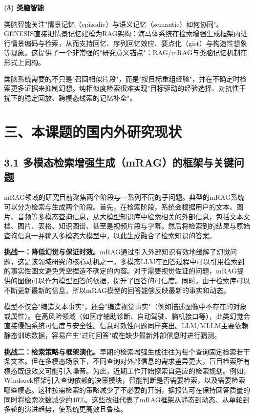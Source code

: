 \documentclass[12pt,a4paper]{article}
\begin{document}
\textbf{(3) 类脑智能}

类脑智能关注"情景记忆（episodic）与语义记忆（semantic）如何协同"。GENESIS直接把情景记忆建模为RAG架构：海马体系统在检索增强生成框架内进行情景编码与检索，从而支持回忆、序列回忆效应、要点化（gist）与构造性想象等现象\cite{genesis2025}。这提供了一个非常强的"研究意义锚点"：RAG/mRAG与类脑记忆机制在形式上同构。

类脑系统需要的不只是"召回相似片段"，而是"按目标重组经验"，并在不确定时检索更多证据来抑制幻想。纯相似度检索很难实现"目标驱动的经验选择、对抗性干扰下的稳定回放、跨模态线索的记忆补全"。

\section*{三、本课题的国内外研究现状}

\subsection*{3.1 多模态检索增强生成（mRAG）的框架与关键问题}

mRAG领域的研究目前聚焦两个阶段与一系列不同的子问题。典型的mRAG系统可以分为检索与生成两个阶段。首先，在检索阶段，系统会根据用户的文本、图片、音频等多模态查询信息，从大模型知识库中检索相关的外部信息，包括文本文档、图片、表格、知识图谱、甚至是视频片段与字幕。然后将检索到的结果与原始查询信息一并输入多模态大模型中，以此生成融合了检索知识的答案\cite{mei2025multimodalrag,abootorabi2025ask}。

\textbf{挑战一：降低幻觉与保证时效。}mRAG通过引入外部知识有效地缓解了幻觉问题，这是该领域研究的核心动机之一\cite{gao2023rag,li2023pope}。多模态LLM在回答过程中可以引用检索到的事实性图文避免凭空捏造不确定的内容。对于需要视觉佐证的问题，mRAG提供的图像可以作为模型回答的依据，提升了回答的可信度。同时，由于检索库可以不断更新最新的信息，所以mRAG模型的回答能够反映最新的事实和动态\cite{mei2025multimodalrag}。

模型不仅会"编造文本事实"，还会"编造视觉事实"（例如描述图像中不存在的对象或属性）。在高风险领域（如医疗辅助诊断、自动驾驶、脑机接口等），此类幻觉会直接侵蚀系统可信度与安全性。信息时效性问题同样突出。LLM/MLLM主要依赖静态训练数据，容易产生"过时回答"或在缺少最新外部信息时进行猜测\cite{gao2023rag}。

\textbf{挑战二：检索策略与框架演化。}早期的检索增强生成往往为每个查询固定检索若干条文本。但在多模态场景下，不同查询对外部信息的需求差异更大，盲目检索所有模态既低效又可能引入噪音。为此，近期工作开始探索自适应的检索规划。例如，Windsock框架引入查询依赖的决策模块，智能判断是否需要检索，以及需要检索哪些模态\cite{zhao2025windsock}。这种按需检索的策略减少了不必要的开销，据报告可在保持回答质量的同时将检索次数减少约40\%。这些改进代表了mRAG框架从静态到动态、从单轮到多轮的演进趋势，使系统更高效且鲁棒。
\end{document}
